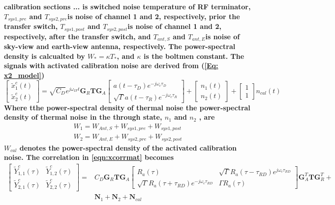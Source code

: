 \documentclass[draftcls,onecolumn]{IEEEtran}  %
\begin{document}
\bf calibration sections ... \rm
is switched noise temperature of RF terminator, $T_{sys1,pre}$ and $T_{sys2,pre}$is noise of channel 1 and 2, respectively, prior the transfer switch, $T_{sys1,post}$ and $T_{sys2,post}$is noise of channel 1 and 2, respectively, after the transfer switch, and $T_{ant,S}$ and $T_{ant,E}$is noise of sky-view and earth-view antenna, respectively.  The power-spectral density is calcualted by $W_*=\kappa T_*$, and $\kappa$ is the boltmen constant. The signals with activated calibration noise are derived from (\ref{Eq: x2_model})
\begin{equation}
      \left[ \begin{array}{c} \tilde{x}^c_1(t) \\ \tilde{x}^c_2(t) \end{array} \right]  =  \sqrt{C_D}e^{j \omega_{IF} t} \mathbf{G}_R \mathbf{T} \mathbf{G}_A
           \left[ \begin{array}{c} a(t-\tau_D) e^{-j \omega_c \tau_D} \\ \sqrt{\Gamma} a(t-\tau_R) e^{-j \omega_c \tau_R} \end{array} \right]  +
           \left[ \begin{array}{c} n_1(t) \\ n_2(t) \end{array} \right]  +
           \left[ \begin{array}{c} 1 \\ 1 \end{array} \right]  n_{cal}(t) 
           \label{Eq: xcal_model}
\end{equation}
Where tthe power-spectral density of thermal noise the power-spectral density of thermal noise in the through state, $n_1$ and $n_2$ , are
\begin{align}
W_1 = W_{Ant,S} +  W_{sys1,pre} +  W_{sys1,post} \\
W_2 = W_{Ant,E} +  W_{sys2,pre} +  W_{sys2,post}
\end{align}
$W_{cal}$ denotes  the power-spectral density of the activated calibration noise.  The correlation in \ref{eqn:xcorrmat} becomes
 \begin{align}
 \left[ \begin{array}{cc}  \tilde{Y}^c_{1,1}(\tau) & \tilde{Y}^c_{1,2}(\tau) \\ \tilde{Y}^c_{2,1}(\tau) & \tilde{Y}^c_{2,2}(\tau)  \end{array} \right] = 
 &C_D \mathbf{G}_R \mathbf{T} \mathbf{G}_A 
 \left[ \begin{array}{cc} R_a(\tau) & \sqrt{\Gamma} R_a(\tau-\tau_{RD})  e^{j \omega_c \tau_{RD} }  \\ 
    \sqrt{\Gamma} R_a(\tau+\tau_{RD}) e^{-j \omega_c \tau_{RD}} & \Gamma R_a(\tau) \end{array} \right]
 \mathbf{G}_A^T \mathbf{T} \mathbf{G}_R^T + \nonumber \\ &\mathbf{N}_1 + \mathbf{N}_2 + \mathbf{N}_{cal}
 \end{align}
\end{document}

